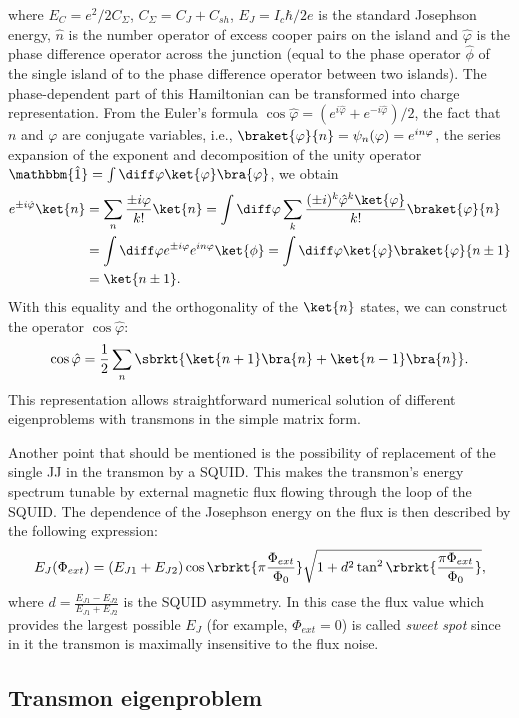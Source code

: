 where $E_C = e^2/2C_\Sigma$, $C_\Sigma = C_J+C_{sh}$, $E_J = I_c \hbar/2e$ is the standard Josephson energy, $\hat n$ is the number operator of excess cooper pairs on the island and $\hat \varphi$ is the phase difference operator across the junction (equal to the phase operator $\hat \phi$ of the single island of to the phase difference operator between two islands\cite{Devoret1995}). The phase-dependent part of this Hamiltonian can be transformed into charge representation. From the Euler's formula $\cos \hat \varphi = (e^{i\hat\varphi} + e^{-i\hat\varphi})/2$, the fact that $n$ and $\varphi$ are conjugate variables, i.e., $\braket{\varphi}{n} = \psi_n(\varphi) = e^{i n \varphi}$, the series expansion of the exponent and decomposition of the unity operator $\mathbbm{\hat 1} = \int \diff \varphi \ket{\varphi}\bra{\varphi}$, we obtain
\[
\begin{aligned}
e^{\pm i \hat \varphi}\ket{n} &= \sum_n \frac{\pm i\varphi}{k!}\ket{n} = \int \diff \varphi \sum_k \frac{(\pm i)^k \hat\varphi^k \ket{\varphi}}{k!}\braket{\varphi}{n}\\
&=  \int \diff \varphi e^{\pm i\varphi} e^{i n \varphi} \ket{\phi} = \int \diff \varphi \ket{\varphi}\braket{\varphi}{n\pm1}\\
&= \ket{n\pm1}.
\end{aligned}
\]
With this equality and the orthogonality of the $\ket{n}$ states, we can construct the operator $\cos\hat\varphi$:
\[
\cos\hat\varphi = \frac{1}{2}\sum_n\sbrkt{\ket{n+1}\bra{n} + \ket{n-1}\bra{n}}.
\]
This representation allows straightforward numerical solution of different eigenproblems with transmons in the simple matrix form.

Another point that should be mentioned is the possibility of replacement of the single JJ in the transmon by a SQUID. This makes the transmon's energy spectrum tunable by external magnetic flux flowing through the loop of the SQUID. The dependence of the Josephson energy on the flux is then described by the following expression\cite{Koch2007}:
\[
E_J(\Phi_{ext}) = (E_{J1} + E_{J2})\cos\rbrkt{\pi\frac{\Phi_{ext}}{\Phi_0}}\sqrt{1+d^2\tan^2\rbrkt{\frac{\pi\Phi_{ext}}{\Phi_0}}},
\]
where $d = \frac{E_{J1} - E_{J2}}{E_{J1} + E_{J2}}$ is the SQUID asymmetry. In this case the flux value which provides the largest possible $E_J$ (for example, $\Phi_{ext} = 0$) is called \textit{sweet spot} since in it the transmon is maximally insensitive to the flux noise.


\subsection{Transmon eigenproblem}\label{sec:tr_eigen}

